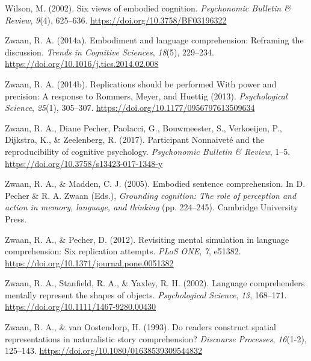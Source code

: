 \documentclass[
  man,mask,floatsintext]{apa7}
\newlength{\cslhangindent}
\newlength{\cslentryspacingunit} %
\newenvironment{CSLReferences}[2] %
 {%
  \setlength{\parindent}{0pt}
  \ifodd #1
  \let\oldpar\par
  \def\par{\hangindent=\cslhangindent\oldpar}
  \fi
  \setlength{\parskip}{#2\cslentryspacingunit}
 }%
 {}
\begin{document}
\begin{CSLReferences}{1}{0}
\leavevmode{}%
Wilson, M. (2002). Six views of embodied cognition. \emph{Psychonomic Bulletin \& Review}, \emph{9}(4), 625--636. \url{https://doi.org/10.3758/BF03196322}

\leavevmode{}%
Zwaan, R. A. (2014a). Embodiment and language comprehension: Reframing the discussion. \emph{Trends in Cognitive Sciences}, \emph{18}(5), 229--234. \url{https://doi.org/10.1016/j.tics.2014.02.008}

\leavevmode{}%
Zwaan, R. A. (2014b). Replications {should be performed With power} and {precision}: {A response} to {Rommers}, {Meyer}, and {Huettig} (2013). \emph{Psychological Science}, \emph{25}(1), 305--307. \url{https://doi.org/10.1177/0956797613509634}

\leavevmode{}%
Zwaan, R. A., Diane Pecher, Paolacci, G., Bouwmeester, S., Verkoeijen, P., Dijkstra, K., \& Zeelenberg, R. (2017). Participant {Nonnaiveté} and the reproducibility of cognitive psychology. \emph{Psychonomic Bulletin \& Review}, 1--5. \url{https://doi.org/10.3758/s13423-017-1348-y}

\leavevmode{}%
Zwaan, R. A., \& Madden, C. J. (2005). Embodied sentence comprehension. In D. Pecher \& R. A. Zwaan (Eds.), \emph{Grounding cognition: {The} role of perception and action in memory, language, and thinking} (pp. 224--245). {Cambridge University Press}.

\leavevmode{}%
Zwaan, R. A., \& Pecher, D. (2012). Revisiting mental simulation in language comprehension: Six replication attempts. \emph{PLoS ONE}, \emph{7}, e51382. \url{https://doi.org/10.1371/journal.pone.0051382}

\leavevmode{}%
Zwaan, R. A., Stanfield, R. A., \& Yaxley, R. H. (2002). Language comprehenders mentally represent the shapes of objects. \emph{Psychological Science}, \emph{13}, 168--171. \url{https://doi.org/10.1111/1467-9280.00430}

\leavevmode{}%
Zwaan, R. A., \& van Oostendorp, H. (1993). Do readers construct spatial representations in naturalistic story comprehension? \emph{Discourse Processes}, \emph{16}(1-2), 125--143. \url{https://doi.org/10.1080/01638539309544832}

\end{CSLReferences}
\end{document}

